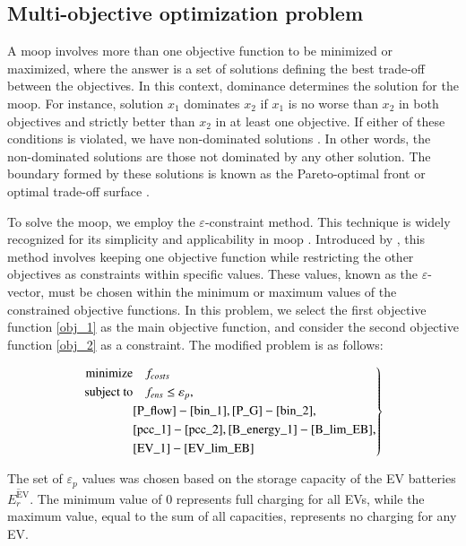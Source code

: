 \documentclass[preprint, 12pt, 3p]{elsarticle}
\begin{document}
\subsection{Multi-objective optimization problem}\label{subsec:moop}

A \gls{moop} involves more than one objective function to be minimized or
maximized, where the answer is a set of solutions defining the best trade-off between the objectives. In this context, dominance determines the solution for the \gls{moop}. For instance, solution $x_1$  dominates $x_2$ if $x_1$ is no worse than $x_2$ in both objectives and strictly better than $x_2$ in at least one objective. If either of these conditions is violated, we have non-dominated solutions \cite{deb11}. In other words, the non-dominated solutions are those not dominated by any other solution. The boundary formed by these solutions is known as the Pareto-optimal front or optimal trade-off surface \cite{boyd2004}.

To solve the \gls{moop}, we employ the $\varepsilon$-constraint method. 
This technique is widely recognized for its simplicity and applicability in \gls{moop} \cite{chiandussi2012}. Introduced by \cite{haimes71}, this method involves keeping one objective function while restricting the other objectives as constraints within specific values. These values, known as the $\varepsilon$-vector, must be chosen within the minimum 
or maximum values of the constrained objective functions. 
In this problem, we select the first objective function \eqref{obj_1} as 
the main objective function, and consider the second objective 
function \eqref{obj_2} as a constraint. The modified problem is as follows:

\begin{equation}
    \left.
    \begin{aligned}
    \text{minimize} &\quad \text{$f_{costs}$}\\
    \text{subject to}&\quad \text{$f_{ens}$} \leq \text{$\varepsilon_{p}$},\\
    &\eqref{P_flow} - \eqref{bin_1}, \eqref{P_G}-\eqref{bin_2},\\
    &\eqref{pcc_1}-\eqref{pcc_2}, \eqref{B_energy_1}-\eqref{B_lim_EB},\\
    &\eqref{EV_1}-\eqref{EV_lim_EB} \\
    \end{aligned}
    \right\}
    \label{final_equation}
\end{equation}

The set of $\varepsilon_{p}$ values was chosen based on the storage capacity of
the EV batteries $\overline{E_{r}^{\text{EV}}}$. The minimum value of $0$ 
represents full charging for all EVs, while the maximum value, equal to the sum
of all capacities, represents no charging for any EV.
\end{document}

